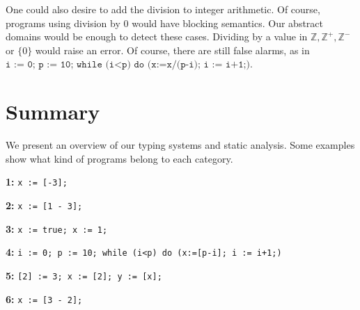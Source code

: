 One could also desire to add the division to integer arithmetic. Of course, programs using division by 0 would have blocking semantics. Our abstract domains would be enough to detect these cases. Dividing by a value in $\mathbb{Z}, \mathbb{Z^+}, \mathbb{Z^-}$ or $\lbrace 0 \rbrace$ would raise an error. Of course, there are still false alarms, as in $\texttt{i := 0; p := 10; while (i<p) do (x:=x/(p-i); i := i+1;)}$.



\section*{Summary}

We present an overview of our typing systems and static analysis. Some examples show what kind of programs belong to each category.

  \begin{center}
  \end{center}

  
  \textbf{1:}
  \texttt{x := [-3];}

  \textbf{2:}
  \texttt{x := [1 - 3];}

  \textbf{3:}
  \texttt{x := true; x := 1;}

  \textbf{4:}
  \texttt{i := 0; p := 10; while (i<p) do (x:=[p-i]; i := i+1;)}

  \textbf{5:}
  \texttt{[2] := 3; x := [2]; y := [x];}

  \textbf{6:}
  \texttt{x := [3 - 2];}
    
